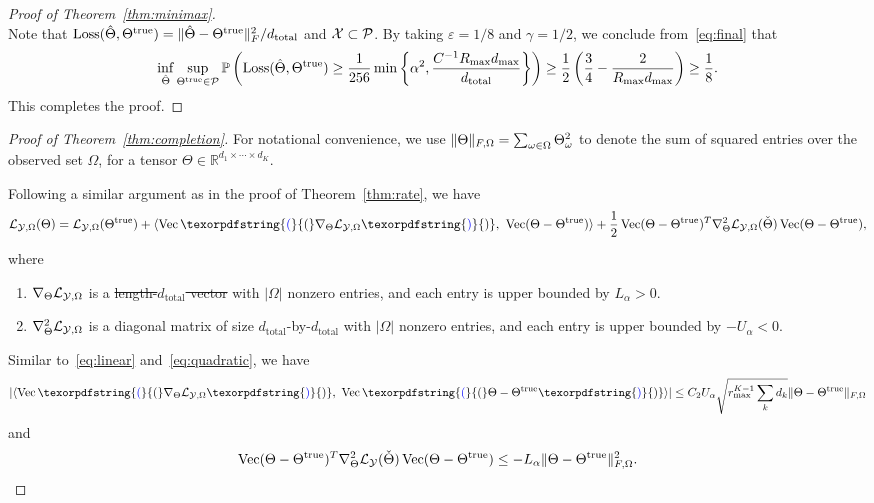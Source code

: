 \documentclass[11pt]{article}
\theoremstyle{plain}
\theoremstyle{definition}
\providecommand{\DIFaddtex}[1]{{\protect\color{blue}\uwave{#1}}} %
\providecommand{\DIFdeltex}[1]{{\protect\color{red}\sout{#1}}}                      %
\providecommand{\DIFaddbegin}{} %
\providecommand{\DIFaddend}{} %
\providecommand{\DIFdelbegin}{} %
\providecommand{\DIFdelend}{} %
\providecommand{\DIFadd}[1]{\texorpdfstring{\DIFaddtex{#1}}{#1}} %
\providecommand{\DIFdel}[1]{\texorpdfstring{\DIFdeltex{#1}}{}} %
\begin{document}
\begin{proof}[Proof of Theorem~\ref{thm:minimax}]
\begin{equation}
\end{equation}
Note that $\text{Loss}(\hat \Theta, \Theta^{\text{true}})=\lVert\hat \Theta- \Theta^{\text{true}}\rVert_F^2/d_{\text{total}}$ and $\mathcal{X}\subset \mathcal{P}$. By taking $\varepsilon=1/8$ and $\gamma=1/2$, we conclude from~\eqref{eq:final} that
\begin{equation*}\label{eq:prob}
\inf_{\hat \Theta}\sup_{\Theta^{\text{true}}\in \mathcal{P}}\mathbb{P}\left(\text{Loss}(\hat \Theta, \Theta^{\text{true}})\geq {1 \over 256}\min\left \{ \alpha^2,  {C^{-1}R_{\max}d_{\max}\over d_{\text{total}}}\right \}\right)\geq {1\over 2}\left({3\over 4}- {2\over R_{\max}d_{\max}} \right)\geq {1\over 8}.
\end{equation*}
This completes the proof.
\end{proof}


\begin{proof}[Proof of Theorem~\ref{thm:completion}]

For notational convenience, we use $\lVert\Theta\rVert_{F,\Omega}=\sum_{\omega\in\Omega}\Theta^2_\omega$ to denote the sum of squared entries over the observed set $\Omega$, for a tensor $\Theta\in\mathbb{R}^{d_1\times \cdots \times d_K}$.

Following a similar argument as in the proof of Theorem~\ref{thm:rate}, we have
\begin{equation}\label{eq:Taylor2}
\logl(\Theta)=\logl(\trueT)+\langle\DIFaddbegin \Vec\DIFadd{(}\DIFaddend \plogl\DIFaddbegin \DIFadd{)}\DIFaddend ,\ \Vec(\Theta-\trueT)\rangle+{1\over 2}\Vec(\Theta-\trueT)^T\pplogl(\check\Theta)\Vec(\Theta-\trueT),
\end{equation}
where
 \begin{enumerate} 
\item $\nabla_{\Theta}\mathcal{L}_{\mathcal{Y},\Omega}$ is a \DIFdelbegin \DIFdel{length-$d_{\text{total}}$ vector }\DIFdelend \DIFaddbegin \DIFadd{$d_1\times\cdots\times d_K$ tensor }\DIFaddend with $|\Omega|$ nonzero entries, and each entry is upper bounded by \DIFdelbegin \DIFdel{$L_\alpha>0$}\DIFdelend \DIFaddbegin \DIFadd{$U_\alpha>0$}\DIFaddend .
\item $\nabla^2_{\Theta}\mathcal{L}_{\mathcal{Y},\Omega}$ is a diagonal matrix of size $d_{\text{total}}$-by-$d_{\text{total}}$ with $|\Omega|$ nonzero entries, and each entry is upper bounded by \DIFdelbegin \DIFdel{$-U_{\alpha}<0$}\DIFdelend \DIFaddbegin \DIFadd{$-L_{\alpha}<0$}\DIFaddend .
 \end{enumerate} 

Similar to~\eqref{eq:linear} and~\eqref{eq:quadratic}, we have
\begin{equation}\label{eq:linear2}
|\langle\DIFaddbegin \Vec\DIFadd{(}\DIFaddend \plogl\DIFaddbegin \DIFadd{)}\DIFaddend ,\ \DIFaddbegin \Vec\DIFadd{(}\DIFaddend \Theta-\trueT\DIFaddbegin \DIFadd{)}\DIFaddend \rangle|\leq C_2U_\alpha \sqrt{r_{\max}^{K-1}\sum_k d_k}\MFnormSize{}{\Theta-\trueT}
\end{equation}
and
\begin{equation}\label{eq:quadratic2}
\operatorname{Vec}(\Theta-\Theta^{\text{true}})^T\nabla^2_{\Theta}\mathcal{L}_{\mathcal{Y}}(\check\Theta)\operatorname{Vec}(\Theta-\Theta^{\text{true}})\leq -L_\alpha \lVert\Theta-\Theta^{\text{true}}\rVert_{F,\Omega}^2.
\end{equation}


\end{proof}
\end{document}
